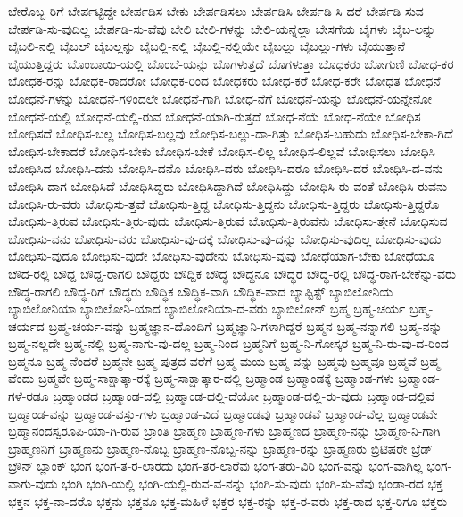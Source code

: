 {ಬೇರೊಬ್ಬ-ರಿಗೆ
ಬೇರ್ಪಟ್ಟಿದ್ದೇ
ಬೇರ್ಪಡಿಸ-ಬೇಕು
ಬೇರ್ಪಡಿಸಲು
ಬೇರ್ಪಡಿಸಿ
ಬೇರ್ಪಡಿ-ಸಿ-ದರೆ
ಬೇರ್ಪಡಿ-ಸುವ
ಬೇರ್ಪಡಿ-ಸು-ವುದಿಲ್ಲ
ಬೇರ್ಪಡಿ-ಸು-ವೆವು
ಬೇಲಿ
ಬೇಲಿ-ಗಳನ್ನು
ಬೇಲಿ-ಯನ್ನೆಲ್ಲಾ
ಬೇಸಗೆಯ
ಬೈಗಳು
ಬೈಬ-ಲನ್ನು
ಬೈಬಲಿ-ನಲ್ಲಿ
ಬೈಬಲ್
ಬೈಬಲ್ಲನ್ನು
ಬೈಬಲ್ಲಿ-ನಲ್ಲಿ
ಬೈಬಲ್ಲಿ-ನಲ್ಲಿಯೇ
ಬೈಬಲ್ಲು
ಬೈಬಲ್ಲು-ಗಳು
ಬೈಯುತ್ತಾನೆ
ಬೈಯುತ್ತಿದ್ದರು
ಬೊಂಬಾಯಿ-ಯಲ್ಲಿ
ಬೊಂಬೆ-ಯನ್ನು
ಬೊಗಳುತ್ತದೆ
ಬೊಗಳುತ್ತಾ
ಬೊಧಕರು
ಬೋಗುಣಿ
ಬೋಧ-ಕರ
ಬೋಧಕ-ರನ್ನು
ಬೋಧಕ-ರಾದರೋ
ಬೋಧಕ-ರಿಂದ
ಬೋಧಕರು
ಬೋಧ-ಕರೆ
ಬೋಧ-ಕರೇ
ಬೋಧತ
ಬೋಧನೆ
ಬೋಧನೆ-ಗಳನ್ನು
ಬೋಧನೆ-ಗಳಿಂದಲೇ
ಬೋಧನೆ-ಗಾಗಿ
ಬೋಧ-ನೆಗೆ
ಬೋಧನೆ-ಯನ್ನು
ಬೋಧನೆ-ಯನ್ನೇನೋ
ಬೋಧನೆ-ಯಲ್ಲಿ
ಬೋಧನೆ-ಯಲ್ಲಿ-ರುವ
ಬೋಧನೆ-ಯಾಗಿ-ರುತ್ತದೆ
ಬೋಧ-ನೆಯೆ
ಬೋಧ-ನೆಯೇ
ಬೋಧಿಸ
ಬೋಧಿಸದೆ
ಬೋಧಿಸ-ಬಲ್ಲ
ಬೋಧಿಸ-ಬಲ್ಲವು
ಬೋಧಿಸ-ಬಲ್ಲು-ದಾ-ಗಿತ್ತು
ಬೋಧಿಸ-ಬಹುದು
ಬೋಧಿಸ-ಬೇಕಾ-ಗಿದೆ
ಬೋಧಿಸ-ಬೇಕಾದರೆ
ಬೋಧಿಸ-ಬೇಕು
ಬೋಧಿಸ-ಬೇಕೆ
ಬೋಧಿಸ-ಲಿಲ್ಲ
ಬೋಧಿಸ-ಲಿಲ್ಲವೆ
ಬೋಧಿಸಲು
ಬೋಧಿಸಿ
ಬೋಧಿಸಿದ
ಬೋಧಿಸಿ-ದನು
ಬೋಧಿಸಿ-ದನೊ
ಬೋಧಿಸಿ-ದರು
ಬೋಧಿಸಿ-ದರೂ
ಬೋಧಿಸಿ-ದರೆ
ಬೋಧಿಸಿ-ದ-ವನು
ಬೋಧಿಸಿ-ದಾಗ
ಬೋಧಿಸಿದೆ
ಬೋಧಿಸಿದ್ದರು
ಬೋಧಿಸಿದ್ದಾಗಿದೆ
ಬೋಧಿಸಿದ್ದು
ಬೋಧಿಸಿ-ರು-ವಂತೆ
ಬೋಧಿಸಿ-ರುವನು
ಬೋಧಿಸಿ-ರು-ವರು
ಬೋಧಿಸು-ತ್ತವೆ
ಬೋಧಿಸು-ತ್ತಿದ್ದ
ಬೋಧಿಸು-ತ್ತಿದ್ದನು
ಬೋಧಿಸು-ತ್ತಿದ್ದರು
ಬೋಧಿಸು-ತ್ತಿದ್ದರೊ
ಬೋಧಿಸು-ತ್ತಿರುವ
ಬೋಧಿಸು-ತ್ತಿರು-ವುದು
ಬೋಧಿಸು-ತ್ತಿರುವೆ
ಬೋಧಿಸು-ತ್ತಿರುವೆನು
ಬೋಧಿಸು-ತ್ತೇನೆ
ಬೋಧಿಸುವ
ಬೋಧಿಸು-ವನು
ಬೋಧಿಸು-ವರು
ಬೋಧಿಸು-ವು-ದಕ್ಕೆ
ಬೋಧಿಸು-ವು-ದನ್ನು
ಬೋಧಿಸು-ವುದಿಲ್ಲ
ಬೋಧಿಸು-ವುದು
ಬೋಧಿಸು-ವುದೂ
ಬೋಧಿಸು-ವುದೇ
ಬೋಧಿಸು-ವುದೇನು
ಬೋಧಿಸು-ವುವು
ಬೋಧೆಯಾಗ-ಬೇಕು
ಬೋಧೆಯೂ
ಬೌದ-ರಲ್ಲಿ
ಬೌದ್ದ
ಬೌದ್ದ-ರಾಗಲಿ
ಬೌದ್ದರು
ಬೌದ್ದಿಕ
ಬೌದ್ಧ
ಬೌದ್ಧನೂ
ಬೌದ್ಧರ
ಬೌದ್ಧ-ರಲ್ಲಿ
ಬೌದ್ಧ-ರಾಗ-ಬೇಕೆನ್ನು-ವರು
ಬೌದ್ಧ-ರಾಗಲಿ
ಬೌದ್ಧ-ರಿಗೆ
ಬೌದ್ಧರು
ಬೌದ್ಧಿಕ
ಬೌದ್ಧಿಕ-ವಾಗಿ
ಬೌದ್ಧಿಕ-ವಾದ
ಬ್ಯಾಪ್ಟಿಸ್ಟ್
ಬ್ಯಾಬಿಲೋನಿಯ
ಬ್ಯಾಬಿಲೋನಿಯಾ
ಬ್ಯಾಬಿಲೋನಿ-ಯಾದ
ಬ್ಯಾಬಿಲೋನಿಯಾ-ದ-ವರು
ಬ್ಯಾಬಿಲೋನ್
ಬ್ರಹ್ಮ
ಬ್ರಹ್ಮ-ಚರ್ಯ
ಬ್ರಹ್ಮ-ಚರ್ಯದ
ಬ್ರಹ್ಮ-ಚರ್ಯ-ವನ್ನು
ಬ್ರಹ್ಮಜ್ಞಾನ-ದೊಂದಿಗೆ
ಬ್ರಹ್ಮಜ್ಞಾನಿ-ಗಳಾಗಿದ್ದರೆ
ಬ್ರಹ್ಮನ
ಬ್ರಹ್ಮ-ನನ್ನಾಗಲಿ
ಬ್ರಹ್ಮ-ನನ್ನು
ಬ್ರಹ್ಮ-ನಲ್ಲದೇ
ಬ್ರಹ್ಮ-ನಲ್ಲಿ
ಬ್ರಹ್ಮ-ನಾಗು-ವು-ದಲ್ಲ
ಬ್ರಹ್ಮ-ನಿಂದ
ಬ್ರಹ್ಮನಿಗೆ
ಬ್ರಹ್ಮ-ನಿ-ಗೋಸ್ಕರ
ಬ್ರಹ್ಮ-ನಿ-ರು-ವು-ದ-ರಿಂದ
ಬ್ರಹ್ಮನೂ
ಬ್ರಹ್ಮ-ನೆಂದರೆ
ಬ್ರಹ್ಮನೇ
ಬ್ರಹ್ಮ-ಪುತ್ರದ-ವರೆಗೆ
ಬ್ರಹ್ಮ-ಮಯ
ಬ್ರಹ್ಮ-ವನ್ನು
ಬ್ರಹ್ಮವು
ಬ್ರಹ್ಮವೂ
ಬ್ರಹ್ಮವೆ
ಬ್ರಹ್ಮ-ವೆಂದು
ಬ್ರಹ್ಮವೇ
ಬ್ರಹ್ಮ-ಸಾಕ್ಷಾತ್ಕಾ-ರಕ್ಕೆ
ಬ್ರಹ್ಮ-ಸಾಕ್ಷಾತ್ಕಾರ-ದಲ್ಲಿ
ಬ್ರಹ್ಮಾಂಡ
ಬ್ರಹ್ಮಾಂಡಕ್ಕೆ
ಬ್ರಹ್ಮಾಂಡ-ಗಳು
ಬ್ರಹ್ಮಾಂಡ-ಗಳೆ-ರಡೂ
ಬ್ರಹ್ಮಾಂಡದ
ಬ್ರಹ್ಮಾಂಡ-ದಲ್ಲಿ
ಬ್ರಹ್ಮಾಂಡ-ದಲ್ಲಿ-ದೆಯೋ
ಬ್ರಹ್ಮಾಂಡ-ದಲ್ಲಿ-ರು-ವುದು
ಬ್ರಹ್ಮಾಂಡ-ದಲ್ಲಿವೆ
ಬ್ರಹ್ಮಾಂಡ-ವನ್ನು
ಬ್ರಹ್ಮಾಂಡ-ವಸ್ತು-ಗಳು
ಬ್ರಹ್ಮಾಂಡ-ವಿದೆ
ಬ್ರಹ್ಮಾಂಡವು
ಬ್ರಹ್ಮಾಂಡವೆ
ಬ್ರಹ್ಮಾಂಡ-ವೆಲ್ಲ
ಬ್ರಹ್ಮಾಂಡವೇ
ಬ್ರಹ್ಮಾನಂದಸ್ವರೂಪಿ-ಯಾ-ಗಿ-ರುವ
ಬ್ರಾಂತಿ
ಬ್ರಾಹ್ಮಣ
ಬ್ರಾಹ್ಮಣ-ಗಳು
ಬ್ರಾಹ್ಮಣದ
ಬ್ರಾಹ್ಮಣ-ನನ್ನು
ಬ್ರಾಹ್ಮಣ-ನಿ-ಗಾಗಿ
ಬ್ರಾಹ್ಮಣನಿಗೆ
ಬ್ರಾಹ್ಮಣನು
ಬ್ರಾಹ್ಮಣ-ನೊಬ್ಬ
ಬ್ರಾಹ್ಮಣ-ನೊಬ್ಬ-ನನ್ನು
ಬ್ರಾಹ್ಮಣ-ರನ್ನು
ಬ್ರಾಹ್ಮಣರು
ಬ್ರಿಟಿಷರೇ
ಬ್ರೆಡ್
ಬ್ರೌನ್
ಬ್ಲಾಂಕ್
ಭಂಗ
ಭಂಗ-ತ-ರ-ಲಾರದು
ಭಂಗ-ತರ-ಲಾರೆವು
ಭಂಗ-ತರು-ವಿರಿ
ಭಂಗ-ವನ್ನು
ಭಂಗ-ವಾಗಿಲ್ಲ
ಭಂಗ-ವಾಗು-ವುದು
ಭಂಗಿ
ಭಂಗಿ-ಯಲ್ಲಿ
ಭಂಗಿ-ಯಲ್ಲಿ-ರುವ-ವ-ನನ್ನು
ಭಂಗಿ-ಸು-ವುದು
ಭಂಗಿ-ಸು-ವೆವು
ಭಂಡಾ-ರದ
ಭಕ್ತ
ಭಕ್ತನ
ಭಕ್ತ-ನಾ-ದರೊ
ಭಕ್ತನು
ಭಕ್ತನೂ
ಭಕ್ತ-ಮಹಿಳೆ
ಭಕ್ತರ
ಭಕ್ತ-ರನ್ನು
ಭಕ್ತ-ರ-ವರು
ಭಕ್ತ-ರಾದ
ಭಕ್ತ-ರಿಗೂ
ಭಕ್ತರು
}
